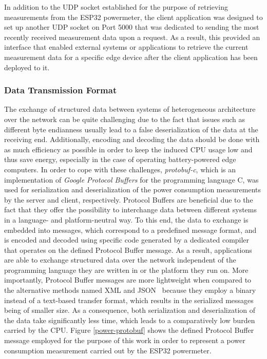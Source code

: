 In addition to the UDP socket established for the purpose of retrieving measurements from the ESP32 powermeter, the client application was designed to set up another UDP socket on Port 5000 that was dedicated to sending the most recently received measurement data upon a request. As a result, this provided an interface that enabled external systems or applications to retrieve the current measurement data for a specific edge device after the client application has been deployed to it.

\subsubsection{Data Transmission Format}
The exchange of structured data between systems of heterogeneous architecture over the network can be quite challenging due to the fact that issues such as different byte endianness usually lead to a false deserialization of the data at the receiving end. Additionally, encoding and decoding the data should be done with as much efficiency as possible in order to keep the induced CPU usage low and thus save energy, especially in the case of operating battery-powered edge computers. In order to cope with these challenges, \textit{protobuf-c}, which is an implementation of \textit{Google Protocol Buffers} for the programming language C, was used for serialization and deserialization of the power consumption measurements by the server and client, respectively. Protocol Buffers are beneficial due to the fact that they offer the possibility to interchange data between different systems in a language- and platform-neutral way. To this end, the data to exchange is embedded into messages, which correspond to a predefined message format, and is encoded and decoded using specific code generated by a dedicated compiler that operates on the defined Protocol Buffer message. As a result, applications are able to exchange structured data over the network independent of the programming language they are written in or the platform they run on. More importantly, Protocol Buffer messages are more lightweight when compared to the alternative methods named XML and JSON~\parencite{protobuffers} because they employ a binary instead of a text-based transfer format, which results in the serialized messages being of smaller size. As a consequence, both serialization and deserialization of the data take significantly less time, which leads to a comparatively low burden carried by the CPU. Figure \ref{power-protobuf} shows the defined Protocol Buffer message employed for the purpose of this work in order to represent a power consumption measurement carried out by the ESP32 powermeter.

